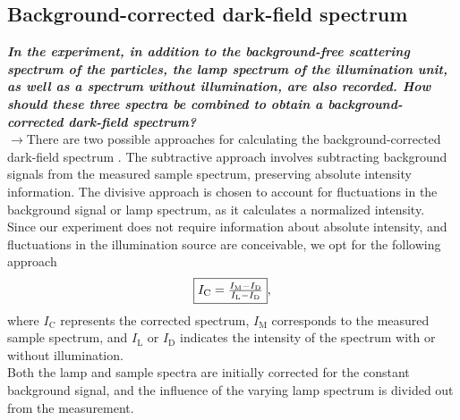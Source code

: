 \subsection{\label{subsec:FZV6}Background-corrected dark-field spectrum}
\textbf{\textit{In the experiment, in addition to the background-free scattering spectrum of the particles, 
the lamp spectrum of the illumination unit, as well as a spectrum without illumination, are also recorded. 
How should these three spectra be combined to obtain a background-corrected dark-field spectrum?}} \\
$\rightarrow$There are two possible approaches for calculating the background-corrected dark-field 
spectrum \cite{FZV5}. The subtractive approach involves subtracting background signals from the measured 
sample spectrum, preserving absolute intensity information. The divisive approach is chosen to account for 
fluctuations in the background signal or lamp spectrum, as it calculates a normalized intensity. \\
Since our experiment does not require information about absolute intensity, and fluctuations in the 
illumination source are conceivable, we opt for the following approach
\begin{equation}
    \fbox{$I_{\text{C}} = \frac{I_{\text{M}}-I_{\text{D}}}{I_{\text{L}}-I_{\text{D}}}$},
\end{equation}
where $I_{\text{C}}$ represents the corrected spectrum, 
$I_{\text{M}}$ corresponds to the measured sample spectrum, and $I_{\text{L}}$ or $I_{\text{D}}$ 
indicates the intensity of the spectrum with or without illumination. \\
Both the lamp and sample spectra are initially corrected for the constant background signal, and 
the influence of the varying lamp spectrum is divided out from the measurement. \\